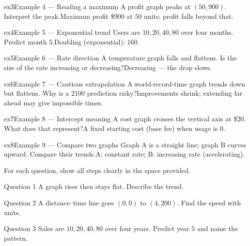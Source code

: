 \documentclass[11pt]{article}
\begin{document}
\begin{example}{ex3}{Example 4 --- Reading a maximum}
A profit graph peaks at $(50,900)$. Interpret the peak.\soln Maximum profit \$900 at $50$ units; profit falls beyond that.
\end{example}

\begin{example}{ex4}{Example 5 --- Exponential trend}
Users are $10,20,40,80$ over four months. Predict month $5$.\soln Doubling (exponential): $160$.
\end{example}

\begin{example}{ex5}{Example 6 --- Rate direction}
A temperature graph falls and flattens. Is the size of the rate increasing or decreasing?\soln Decreasing — the drop slows.
\end{example}

\begin{example}{ex6}{Example 7 --- Cautious extrapolation}
A world-record-time graph trends down but flattens. Why is a $2100$ prediction risky?\soln Improvements shrink; extending far ahead may give impossible times.
\end{example}

\begin{example}{ex7}{Example 8 --- Intercept meaning}
A cost graph crosses the vertical axis at \$20. What does that represent?\soln A fixed starting cost (base fee) when usage is $0$.
\end{example}

\begin{example}{ex8}{Example 9 --- Compare two graphs}
Graph A is a straight line; graph B curves upward. Compare their trends.\soln A: constant rate; B: increasing rate (accelerating).
\end{example}

\clearpage
{}
For each question, show all steps clearly in the space provided.

\begin{qbox}{Question 1}
A graph rises then stays flat. Describe the trend.\workspace{2.4cm}
\end{qbox}

\begin{qbox}{Question 2}
A distance–time line goes $(0,0)$ to $(4,200)$. Find the speed with units.\workspace{2.4cm}
\end{qbox}

\begin{qbox}{Question 3}
Sales are $10,20,40,80$ over four years. Predict year $5$ and name the pattern.\workspace{2.4cm}
\end{qbox}
\end{document}
